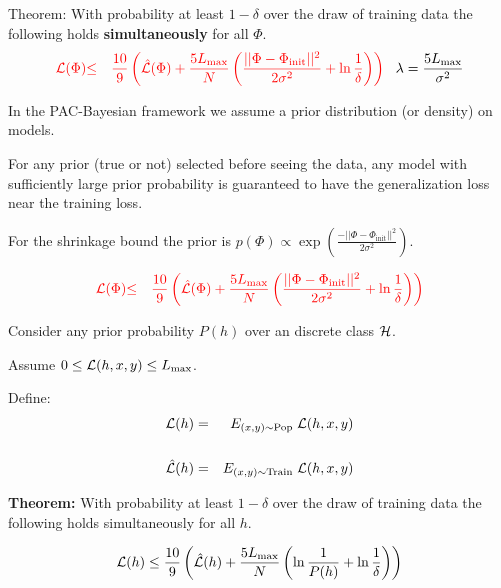 {\vfill
Theorem: With probability at least $1-\delta$ over the draw of training data the following holds {\bf simultaneously} for all $\Phi$.
\begin{eqnarray*}
   {\color{red} {\cal L}(\Phi)} & {\color{red} \leq} & {\color{red} \frac{10}{9}\left(\hat{{\cal L}}(\Phi)
   + \frac{5 L_{\max}}{N}\left(\frac{||\Phi-\Phi_{\mathrm{init}}||^2}{2\sigma^2} + \ln \frac{1}{\delta}\right)\right)}
   \;\;\;\lambda = \frac{5L_{\max}}{\sigma^2}
\end{eqnarray*}



\vfill
In the PAC-Bayesian framework we assume a prior distribution (or density) on models.

\vfill
For any prior (true or not) selected before seeing the data, any model with sufficiently large prior probability is guaranteed to have the generalization loss near the training loss.

\vfill
For the shrinkage bound the prior is $p(\Phi) \propto  \exp\left(\frac{-||\Phi -\Phi_{\mathrm{init}}||^2}{2\sigma^2}\right)$.

\begin{eqnarray*}
   {\color{red} {\cal L}(\Phi)} & {\color{red} \leq} & {\color{red} \frac{10}{9}\left(\hat{{\cal L}}(\Phi)
   + \frac{5 L_{\max}}{N}\left(\frac{||\Phi-\Phi_{\mathrm{init}}||^2}{2\sigma^2} + \ln \frac{1}{\delta}\right)\right)}
\end{eqnarray*}



Consider any prior probability $P(h)$ over an discrete class ${\cal H}$.

\vfill
Assume $0 \leq {\cal L}(h,x,y) \leq L_{\max}$.

\vfill
Define:
\begin{eqnarray*}
{\cal L}(h)  & = &  E_{(x,y)\sim \mathrm{Pop}}\;{\cal L}(h,x,y) \\
\\
\hat{{\cal L}}(h) & = & E_{(x,y)\sim \mathrm{Train}}\;{\cal L}(h,x,y)
\end{eqnarray*}

\vfill
    {\bf Theorem:} With probability
    at least $1-\delta$ over the draw of training data the following holds simultaneously for all $h$.

\vfill
    $${\cal L}(h) \leq \frac{10}{9}\left(\hat{\cal L}(h) + \frac{5 L_\mathrm{max}}{N}\left(\ln \frac{1}{P(h)} + \ln\frac{1}{\delta}\right)\right)$$


}
